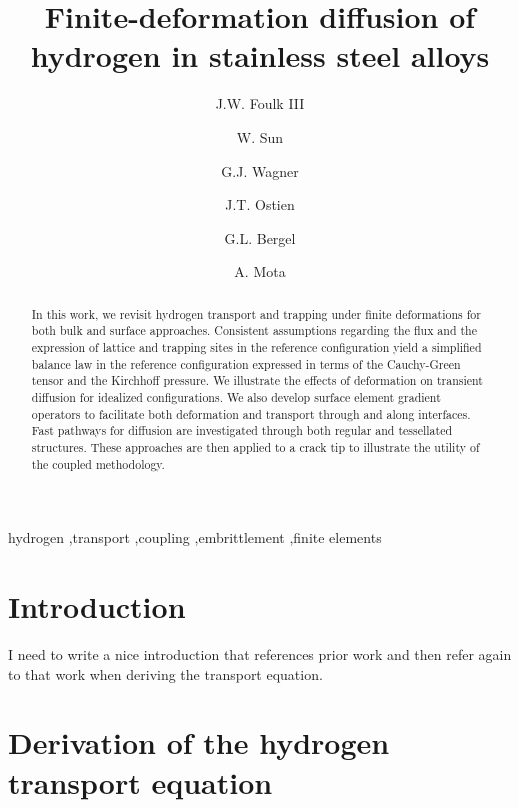 \documentclass[10pt]{elsarticle}
\begin{document}
%
\begin{frontmatter}
%
\title{Finite-deformation diffusion of hydrogen in stainless steel alloys}

\author[SNL]{J.W. Foulk III} \author[UC]{W. Sun}\author[NW]{G.J. Wagner}\author[SNL]{J.T. Ostien}
\author[UCB]{G.L. Bergel} \author[SNL]{A. Mota}
\address[SNL]{Sandia National Laboratories, Livermore, CA, 94550, USA}
\address[UC]{Columbia University, New York, NY, 10027, USA}
\address[NW]{Northwestern University, Evanston, IL, 60208, USA}
\address[UCB]{University of California, Berkeley, Berkeley, CA 94720, USA}
\begin{abstract}
In this work, we revisit hydrogen transport and trapping under finite deformations for both bulk and surface approaches. Consistent assumptions regarding the flux and the expression of lattice and trapping sites in the reference configuration yield a simplified balance law in the reference configuration expressed in terms of the Cauchy-Green tensor and the Kirchhoff pressure. We illustrate the effects of deformation on transient diffusion for idealized configurations. We also develop surface element gradient operators to facilitate both deformation and transport through and along interfaces. Fast pathways for diffusion are investigated through both regular and tessellated structures. These approaches are then applied to a crack tip to illustrate the utility of the coupled methodology.\end{abstract}
\begin{keyword}
hydrogen \sep transport \sep coupling \sep embrittlement
\sep finite elements
\end{keyword}
\end{frontmatter}
%
%
\section{Introduction}
\label{section.introduction}

I need to write a nice introduction that references prior work and then refer again to that work when deriving the transport equation.
\section{Derivation of the hydrogen transport equation}
\end{document}
